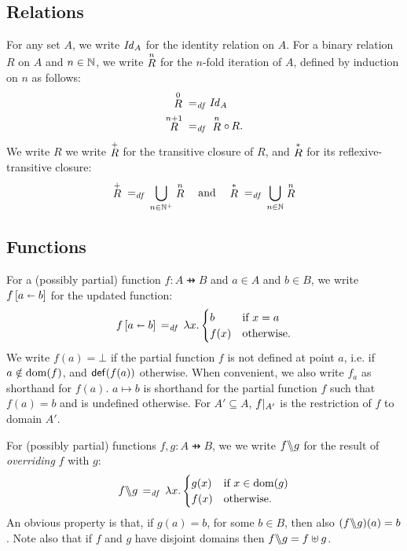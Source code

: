 \documentclass[11pt]{report}
\begin{document}
\subsection{Relations}
\label{sec:relations}

For any set $A$, we write $\ident{A}$ for the identity relation on $A$. For a binary relation $R$ on $A$ and $n \in \setnaturals$, we write $\relexp{R}{n}$ for the $n$-fold iteration of $A$, defined by induction on $n$ as follows: \begin{align*} \relexp{R}{0} \eqdef &\ident{A} \\ 
\relexp{R}{n+1} \eqdef & \relexp{R}{n} \rcomp R.\end{align*} We write $R$ we write $\tcl{R}$ for the transitive closure of $R$, and $\rtcl{R}$ for its reflexive-transitive closure: \begin{align*}
    \tcl{R} \eqdef \bigcup_{n \in \setpositives} \relexp{R}{n} \text{~~~and~~~}
    \rtcl{R} \eqdef \bigcup_{n \in \setnaturals} \relexp{R}{n} 
\end{align*}

\subsection{Functions}
\label{sec:functions}

For a (possibly partial) function $f : A \pfun B$ and $a \in A$ and $b \in B$, we write $\funup{f}{\ptup{a}{b}}$ for the updated function: \[ \funup{f}{\ptup{a}{b}} \eqdef \lambda x . \begin{cases}
	b & \text{if $x = a$} \\
	f(x) & \text{otherwise.}
\end{cases}\] We write $f(a) = \bot$ if the partial function $f$ is not defined at point $a$, i.e. if $a \notin \dom{f}$, and $\defined{f(a)}$ otherwise. When convenient, we also write $f_a$ as shorthand for $f(a)$. $a \mapsto b$ is shorthand for the partial function $f$ such that $f(a) = b$ and is undefined otherwise. For $A' \subseteq A$, $\restrict{f}{A'}$ is the restriction of $f$ to domain $A'$. 

For (possibly partial) functions $f,g : A \pfun B$, we we write $f \override g$ for the result of \emph{overriding} $f$ with $g$: \[ f \override g \eqdef \lambda x . \begin{cases}
	g(x) & \text{if $x \in \dom{g}$} \\
	f(x) & \text{otherwise.}
\end{cases} \] An obvious property is that, if $g(a) = b$, for some $b \in B$, then also $(f \override g)(a) = b$. Note also that if $f$ and $g$ have disjoint domains then $f \override g = f \uplus g$. 
\end{document}
